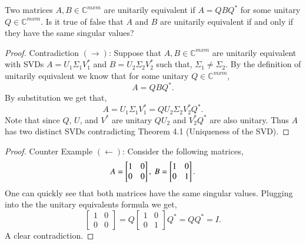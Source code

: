 \documentclass[12pt]{article}
\makeatletter
\theoremstyle{homework}
\newenvironment{exercise}[1]
{\def\@currentlabel{#1}\exercisecore}
{\endexercisecore}
\newcommand{\Cplx}{\ensuremath{\mathbb C}}
\let\CC\Cplx
\makeatother
\begin{document}
\begin{exercise}{4.4} Two matrices $A,B \in \CC^{mxm}$ are unitarily equivalent if $A = QBQ^*$ for some 
  unitary $Q\in \CC^{mxm}$. Is it true of false that $A$ and $B$ are unitarily equivalent if and only if they have 
  the same singular values?\\
  \begin{proof}{Contradiction $(\rightarrow)$}:
    Suppose that $A,B \in \CC^{mxm}$ are unitarily equivalent with SVDs $A = U_1\Sigma_1V^*_1$ and $B = U_2\Sigma_2V^*_2$ such that, 
    $\Sigma_1 \neq \Sigma_2$. By the definition of unitarily equivalent we know that for some unitary $Q\in \CC^{mxm}$, 
    \begin{equation*}
      A = QBQ^*.
    \end{equation*}
    By substitution we get that, 
    \begin{equation*}
      A = U_1\Sigma_1V^*_1 =  QU_2\Sigma_2V^*_2Q^*.
    \end{equation*}
    Note that since $Q$, $U$, and $V^*$ are unitary $QU_2$ and $V^*_2Q^*$ are also unitary. Thus $A$ has two distinct SVDs contradicting 
    Theorem 4.1 (Uniqueness of the SVD).
  \end{proof}
  \begin{proof}{Counter Example $(\leftarrow)$}:
    Consider the following matrices, 
    \begin{equation*}
      A = \begin{bmatrix}
        1 & 0\\
        0 & 0
      \end{bmatrix},\text{    }\hfill
      B = \begin{bmatrix}
        1 & 0\\
        0 & 1
      \end{bmatrix}.
    \end{equation*} 
    One can quickly see that both matrices have the same singular values. Plugging into the the unitary equivalents formula we get, 
    \begin{equation*}
      \begin{bmatrix}
        1 & 0\\
        0 & 0
      \end{bmatrix}
      =
      Q
      \begin{bmatrix}
        1 & 0\\
        0 & 1
      \end{bmatrix}
      Q^*
      = 
      QQ^*
      =
      I.
    \end{equation*} 
    A clear contradiction. 
  \end{proof}
\end{exercise}
\end{document}
